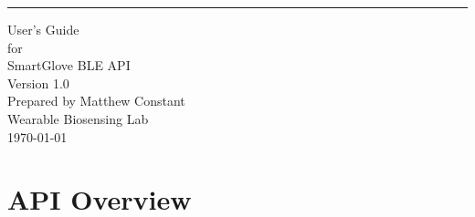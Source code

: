 \documentclass{scrreprt}
\date{}
\def\myversion{1.0 }
\begin{document}
\begin{flushright}
    \rule{16cm}{5pt}\vskip1cm
    \begin{bfseries}
        \Huge{User's Guide}\\
        \vspace{1.9cm}
        for\\
        \vspace{1.9cm}
        SmartGlove BLE API\\
        \vspace{1.9cm}
        \LARGE{Version \myversion}\\
        \vspace{1.9cm}
        Prepared by Matthew Constant\\
        \vspace{1.9cm}
       Wearable Biosensing Lab\\
        \vspace{1.9cm}
        \today\\
    \end{bfseries}
\end{flushright}

\tableofcontents




\chapter{API Overview}
\end{document}
